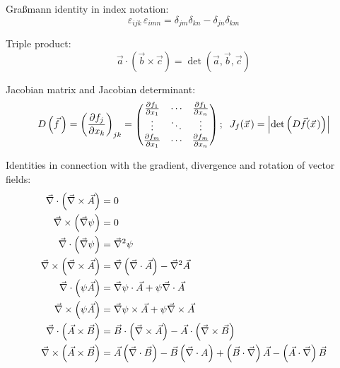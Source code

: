 			\noindent
			Graßmann identity in index notation:
			\begin{equation}
				\varepsilon_{ijk}\,\varepsilon_{imn}=\delta_{jm}\delta_{kn}-\delta_{jn}\delta_{km}
			\end{equation}

			\noindent
			Triple product:
			\begin{equation}
				\vec{a}\cdot\left(\vec{b}\times\vec{c}\right) = \det\left(\vec{a},\vec{b},\vec{c}\right)
			\end{equation}

			\noindent
			Jacobian matrix and Jacobian determinant:
			\begin{equation}
				D\left(\vec{f}\,\right) = \left(\frac{\partial f_j}{\partial x_k}\right)_{jk}
				= \left(\begin{matrix}
				\frac{\partial f_1}{\partial x_1} & \dotsb & \frac{\partial f_1}{\partial x_n} \\
				\vdots & \ddots & \vdots \\
				\frac{\partial f_m}{\partial x_1} & \dotsb & \frac{\partial f_m}{\partial x_n} \\
				\end{matrix}\right);\;\;J_f(\pvec{x})=\abs{\det\left(D\vec{f}(\pvec{x})\right)}
			\end{equation}

			\noindent
			Identities in connection with the gradient, divergence and rotation of vector fields:
			\begin{equation}
				\begin{aligned}
					\vec{\nabla}\cdot\left(\vec{\nabla}\times\vec{A}\right) &= 0 \\
					\vec{\nabla}\times\left(\vec{\nabla}\psi\right) &= 0 \\
					\vec{\nabla}\cdot\left(\vec{\nabla}\psi\right) &= \vec{\nabla}^2\psi \\
					\vec{\nabla}\times\left(\vec{\nabla}\times\vec{A}\right) &= \vec{\nabla}\left(\vec{\nabla}\cdot\vec{A}\right) -\vec{\nabla}^2\vec{A} \\
					\vec{\nabla}\cdot\left(\psi\vec{A}\right) &= \vec{\nabla}\psi\cdot\vec{A} + \psi\vec{\nabla}\cdot\vec{A}\\
					\vec{\nabla}\times\left(\psi\vec{A}\right) &= \vec{\nabla}\psi\times\vec{A} + \psi\vec{\nabla}\times\vec{A} \\
					\vec{\nabla}\cdot\left(\vec{A}\times\vec{B}\right) &= \vec{B}\cdot\left(\vec{\nabla}\times\vec{A}\right) - 	\vec{A}\cdot\left(\vec{\nabla}\times\vec{B}\right) \\
					\vec{\nabla}\times\left(\vec{A}\times\vec{B}\right) &= \vec{A}\left(\vec{\nabla}\cdot\vec{B}\right) - \vec{B}\left(\vec{\nabla}\cdot{A}\right) + \left(\vec{B}\cdot\vec{\nabla}\right)\vec{A} - \left(\vec{A}\cdot\vec{\nabla}\right)\vec{B} \\
				\end{aligned}
			\end{equation}

